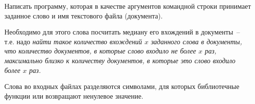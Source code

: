 
Написать программу, которая в качестве аргументов командной строки
принимает заданное слово и имя текстового файла (документа).

Необходимо для этого слова посчитать медиану его
вхождений в документы~-- т.е. надо \textit{найти такое количество вхождений $x$
заданного слова в документы, что количество документов, в которые слово
входило не более $x$ раз, максимально близко к количеству документов, в
которые это слово входило более $x$ раз.}

Слова во входных файлах разделяются символами, для которых
библиотечные функции  или  возвращают ненулевое
значение.
